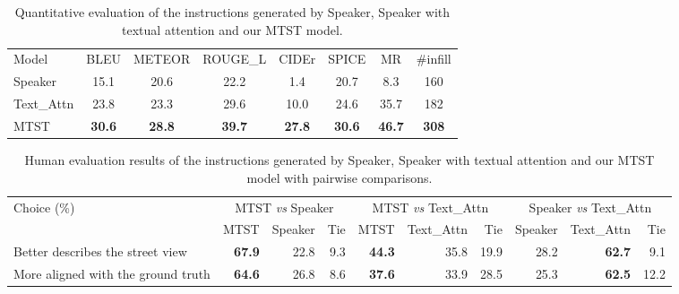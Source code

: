 \documentclass[11pt,a4paper]{article}
\begin{document}
\begin{table}[t]
\setlength{\tabcolsep}{2.5pt}
\begin{adjustbox}{width=\linewidth,center}

\begin{tabular}{l | c c c c c c c}
\cmidrule[\heavyrulewidth]{1-8}
Model       & BLEU  & METEOR    & ROUGE\_L  & CIDEr & SPICE & MR & \#infill  \\ \cmidrule[\heavyrulewidth]{1-8}
Speaker    & 15.1  & 20.6      & 22.2      & 1.4   & 20.7  & 8.3 &  160 \\ Text\_Attn & 23.8  & 23.3      & 29.6      & 10.0  & 24.6  & 35.7 &  182 \\ MTST      & \textbf{30.6}  & \textbf{28.8}      & \textbf{39.7}      & \textbf{27.8} & \textbf{30.6}  & \textbf{46.7} &  \textbf{308} \\
\cmidrule[\heavyrulewidth]{1-8}
\end{tabular}
\end{adjustbox}
\caption{Quantitative evaluation of the instructions generated by Speaker, Speaker with textual attention and our MTST model.}
\label{tab:nlg_metrics}
\end{table}



\begin{table*}[htbp]
\setlength{\tabcolsep}{4pt}
\begin{adjustbox}{width=0.9\linewidth,center}
\begin{tabular}{l | r r r | r r r | r r r }
\cmidrule[\heavyrulewidth]{1-10}
\multirow{2}{*}{Choice (\%)}      & \multicolumn{3}{c}{MTST \textit{vs} Speaker} & \multicolumn{3}{|c}{MTST \textit{vs} Text\_Attn} & \multicolumn{3}{|c}{Speaker \textit{vs} Text\_Attn} \\ \cmidrule{2-10}
                            & MTST & Speaker & Tie & MTST & Text\_Attn & Tie & Speaker & Text\_Attn & Tie \\ \cmidrule[\heavyrulewidth]{1-10}
Better describes the street view  & \textbf{67.9}& 22.8  & 9.3       & \textbf{44.3} & 35.8 & 19.9  & 28.2  & \textbf{62.7}  & 9.1    \\ More aligned with the ground truth & \textbf{64.6}  & 26.8  & 8.6   & \textbf{37.6} & 33.9 & 28.5  & 25.3  & \textbf{62.5}  & 12.2    \\ \cmidrule[\heavyrulewidth]{1-10}
\end{tabular}
\end{adjustbox}
\caption{Human evaluation results of the instructions generated by Speaker, Speaker with textual attention and our MTST model with pairwise comparisons.}
\label{tab:mturk}
\end{table*}
\end{document}
